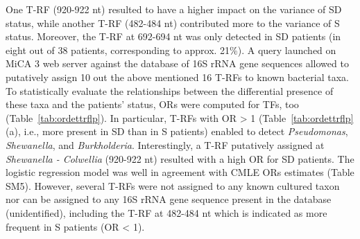One T-RF (920-922 nt) resulted to have a higher impact on the variance of SD status, while another T-RF (482-484 nt) contributed more to the variance of S status. Moreover, the T-RF at 692-694 nt was only detected in SD patients (in eight out of 38 patients, corresponding to approx. 21\%). A query launched on MiCA 3 web server against the database of 16S rRNA gene sequences allowed to putatively assign 10 out the above mentioned 16 T-RFs to known bacterial taxa. To statistically evaluate the relationships between the differential presence of these taxa and the patients' status, ORs were computed for TFs, too (Table~\ref{tab:ordettrflp}). In particular, T-RFs with OR {\textgreater} 1 (Table~\ref{tab:ordettrflp} (a), i.e., more present in SD than in S patients) enabled to detect \textit{Pseudomonas}, \textit{Shewanella}, and \textit{Burkholderia}. Interestingly, a T-RF putatively assigned at \textit{Shewanella - Colwellia} (920-922 nt) resulted with a high OR for SD patients. The logistic regression model was well in agreement with CMLE ORs estimates (Table SM5). However, several T-RFs were not assigned to any known cultured taxon nor can be assigned to any 16S rRNA gene sequence present in the database (unidentified), including the T-RF at 482-484 nt which is indicated as more frequent in S patients (OR {\textless} 1).\\
